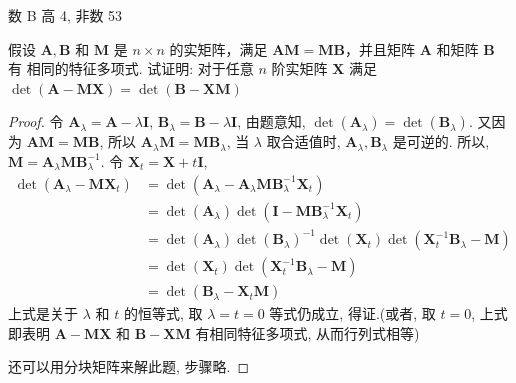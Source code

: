 \documentclass[a4paper, 12pt, UTF8]{ctexart}
\begin{document}
{\color{GoogleGreen} 数 B 高 4, 非数 53 

}

\clearpage
\begin{exa}
    假设 $\boldsymbol{A, B}$ 和 $\boldsymbol{M}$ 是 $n\times n$ 的实矩阵，满足 $\boldsymbol{AM = MB}$，并且矩阵 $\boldsymbol{A}$ 和矩阵 $\boldsymbol{B}$ 有 相同的特征多项式. 试证明: 对于任意 $n$ 阶实矩阵 $\boldsymbol{X}$ 满足 $\det(\boldsymbol{A} − \boldsymbol{MX}) = \det(\boldsymbol{B}−\boldsymbol{XM})$
\end{exa}

{\color{GoogleRed}
  \begin{proof}
      令 $\boldsymbol{A}_{\lambda} = \boldsymbol{A} - \lambda\boldsymbol{I}$, $\boldsymbol{B}_{\lambda} = \boldsymbol{B} - \lambda\boldsymbol{I}$, 由题意知, $\det (\boldsymbol{A}_{\lambda}) = \det (\boldsymbol{B}_{\lambda})$. 又因为 $\boldsymbol{AM = MB}$, 所以 $\boldsymbol{A}_{\lambda}\boldsymbol{M} = \boldsymbol{M}\boldsymbol{B}_{\lambda}$, 当 $\lambda$ 取合适值时, $\boldsymbol{A}_{\lambda}, \boldsymbol{B}_{\lambda}$ 是可逆的. 所以, $\boldsymbol{M} = \boldsymbol{A}_{\lambda}\boldsymbol{M}\boldsymbol{B}_{\lambda}^{-1}$. 令 $\boldsymbol{X}_{t} = \boldsymbol{X} + t\boldsymbol{I}$,
      \[
          \begin{aligned}
              \det(\boldsymbol{A}_{\lambda} -
              \boldsymbol{M}\boldsymbol{X}_{t}) &= \det(\boldsymbol{A}_{\lambda} -
              \boldsymbol{A}_{\lambda}\boldsymbol{M}\boldsymbol{B}_{\lambda}^{-1}\boldsymbol{X}_{t}) \\[3pt]
              &= \det(\boldsymbol{A}_{\lambda}) \det(\boldsymbol{I} - \boldsymbol{M}\boldsymbol{B}_{\lambda}^{-1}\boldsymbol{X}_{t}) \\[3pt]
              &= \det(\boldsymbol{A}_{\lambda})\det(\boldsymbol{B}_{\lambda})^{-1}\det(\boldsymbol{X}_{t})\det(\boldsymbol{X}_{t}^{-1}\boldsymbol{B}_{\lambda} - \boldsymbol{M}) \\[3pt]
              &= \det(\boldsymbol{X}_{t})\det(\boldsymbol{X}_{t}^{-1}\boldsymbol{B}_{\lambda} - \boldsymbol{M}) \\
              & = \det(\boldsymbol{B}_{\lambda} -
              \boldsymbol{X}_{t}\boldsymbol{M})
          \end{aligned}
      \]
      上式是关于 $\lambda$ 和 $t$ 的恒等式, 取 $\lambda = t = 0$ 等式仍成立, 得证.(或者, 取 $t=0$, 上式即表明 $\boldsymbol{A} − \boldsymbol{MX}$ 和 $\boldsymbol{B} − \boldsymbol{XM}$ 有相同特征多项式, 从而行列式相等)

      还可以用分块矩阵来解此题, 步骤略.
      
  \end{proof}
}
\end{document}
